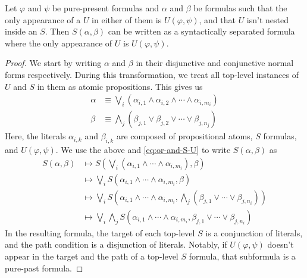 \documentclass[a4paper,UKenglish,cleveref, autoref, thm-restate, numberwithinsect]{lipics-v2021}
\begin{document}
\begin{lemma}
\label{lemma:separation-linear-step1}
    Let $\varphi$ and $\psi$ be pure-present formulas and $\alpha$ and $\beta$ be formulas such that the only appearance of a $U$ in either of them is $U(\varphi, \psi)$, and that $U$ isn't nested inside an $S$. Then $S(\alpha, \beta)$ can be written as a syntactically separated formula where the only appearance of $U$ is $U(\varphi, \psi)$.
\end{lemma}
\begin{proof}
    We start by writing $\alpha$ and $\beta$ in their disjunctive and conjunctive normal forms respectively. During this transformation, we treat all top-level instances of $U$ and $S$ in them as atomic propositions. This gives us
    \begin{equation*}
        \begin{aligned}
            \alpha &\equiv \bigvee_i \left( \alpha_{i, 1} \land \alpha_{i, 2} \land \cdots \land \alpha_{i, m_i} \right)\\
            \beta &\equiv \bigwedge_j \left( \beta_{j, 1} \lor \beta_{j, 2} \lor \cdots \lor \beta_{j, n_j} \right)
        \end{aligned}
    \end{equation*}
    Here, the literals $\alpha_{i, k}$ and $\beta_{i, k}$ are composed of propositional atoms, $S$ formulas, and $U(\varphi, \psi)$. We use the above and \cref{eq:or-and-S-U} to write $S(\alpha, \beta)$ as
    \begin{equation}
        \label{eq:dnf-form-S-alpha-beta}
        \begin{aligned}
            S(\alpha, \beta) &\longmapsto S\left(\bigvee_i (\alpha_{i, 1} \land \cdots \land \alpha_{i, m_i}), \beta\right)\\
            &\longmapsto \bigvee_i S(\alpha_{i, 1} \land \cdots \land \alpha_{i, m_i}, \beta)\\
            &\longmapsto \bigvee_i S\left(\alpha_{i, 1} \land \cdots \land \alpha_{i, m_i}, \bigwedge_j \left( \beta_{j, 1} \lor \cdots \lor \beta_{j, n_i} \right) \right)\\
            &\longmapsto \bigvee_i \bigwedge_j S\left(\alpha_{i, 1} \land \cdots \land \alpha_{i, m_i}, \beta_{j, 1} \lor \cdots \lor \beta_{j, n_i} \right)
        \end{aligned}
    \end{equation}
    In the resulting formula, the target of each top-level $S$ is a conjunction of literals, and the path condition is a disjunction of literals. Notably, if $U(\varphi, \psi)$ doesn't appear in the target and the path of a top-level $S$ formula, that subformula is a pure-past formula.


\end{proof}
\end{document}
